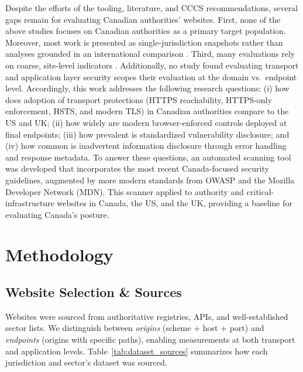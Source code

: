 \documentclass[conference]{IEEEtran}
\begin{document}
Despite the efforts of the tooling, literature, and CCCS recommendations, several gaps remain for evaluating
Canadian authorities’ websites. First, none of the above studies focuses on
Canadian authorities as a primary target population. Moreover, most work is presented as single-jurisdiction
snapshots rather than analyses grounded in an international comparison
\cite{dunbar4240917survey,schiavone2024municipality2https,valdaserides2024automated}. Third, many evaluations
rely on coarse, site-level indicators \cite{dunbar4240917survey,schiavone2024municipality2https}. Additionally, no study found evaluating
transport and application layer security scopes their evaluation at the domain vs.\ endpoint level.
Accordingly, this work addresses the following research questions:
(i) how does adoption of transport protections (HTTPS reachability, HTTPS-only enforcement, HSTS, and modern TLS) in Canadian authorities compare to the US and UK;
(ii) how widely are modern browser-enforced controls deployed at final endpoints;
(iii) how prevalent is standardized vulnerability disclosure;
and (iv) how common is inadvertent information disclosure through error handling and response metadata.
To answer these questions, an automated scanning tool was developed that incorporates the most recent
Canada-focused security guidelines, augmented by more modern standards from OWASP and the Mozilla Developer Network (MDN). 
This scanner applied to authority and critical-infrastructure websites in Canada, the US, and the UK, 
providing a baseline for evaluating Canada’s posture.

\section{Methodology}

\subsection{Website Selection \& Sources}

Websites were sourced from authoritative registries, APIs, and well-established sector lists. 
We distinguish between \emph{origins} (scheme + host + port) and \emph{endpoints} (origins with
specific paths), enabling measurements at both transport and application levels. Table~\ref{tab:dataset_sources}
summarizes how each jurisdiction and sector's dataset was sourced.
\end{document}
